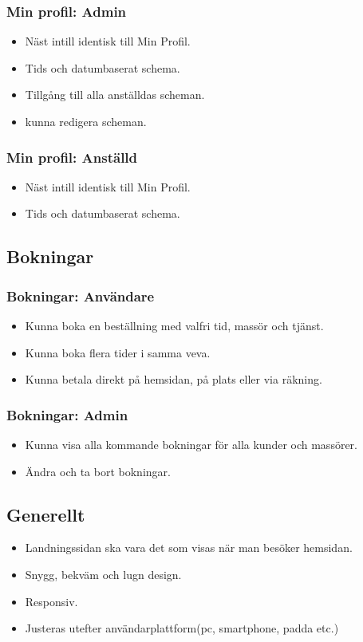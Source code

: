 \documentclass[11pt, titlepage, oneside, a4paper]{article}	%
\begin{document}
	\subsubsection*{Min profil: Admin}
	\begin{itemize}
		\item Näst intill identisk till Min Profil.
		\item Tids och datumbaserat schema.
		\item Tillgång till alla anställdas scheman.
		\item kunna redigera scheman.
	\end{itemize}
	\subsubsection*{Min profil: Anställd}
	\begin{itemize}
		\item Näst intill identisk till Min Profil.
		\item Tids och datumbaserat schema.
	\end{itemize}
	
\subsection{Bokningar}
	\subsubsection*{Bokningar: Användare}
	\begin{itemize}
		\item Kunna boka en beställning med valfri tid, massör och tjänst.
		\item Kunna boka flera tider i samma veva.
		\item Kunna betala direkt på hemsidan, på plats eller via räkning.
	\end{itemize}
	\subsubsection*{Bokningar: Admin}
	\begin{itemize}
		\item Kunna visa alla kommande bokningar för alla kunder och massörer.
		\item Ändra och ta bort bokningar.
	\end{itemize}
	
\subsection{Generellt}
\begin{itemize}
	\item Landningssidan ska vara det som visas när man besöker hemsidan.
	\item Snygg, bekväm och lugn design.
	\item Responsiv.
	\item Justeras utefter användarplattform(pc, smartphone, padda etc.)
\end{itemize}

 


\newpage
\appendix
\end{document}
